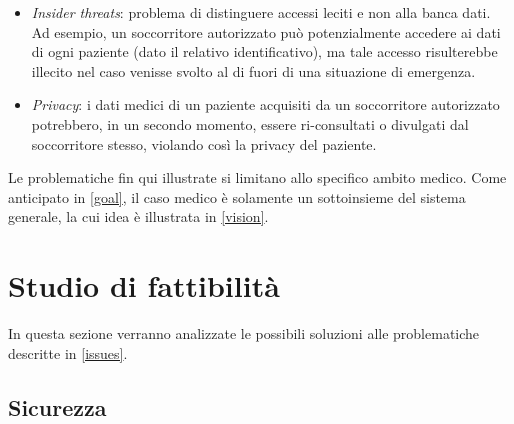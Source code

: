 \documentclass[a4paper,12pt]{report}
\begin{document}
\begin{description}
\begin{itemize}
		\item \emph{Insider threats}: problema di distinguere accessi leciti e non alla banca dati. Ad esempio, un soccorritore autorizzato può potenzialmente accedere ai dati di ogni paziente (dato il relativo identificativo), ma tale accesso risulterebbe illecito nel caso venisse svolto al di fuori di una situazione di emergenza.
		\item \emph{Privacy}: i dati medici di un paziente acquisiti da un soccorritore autorizzato potrebbero, in un secondo momento, essere ri-consultati o divulgati dal soccorritore stesso, violando così la privacy del paziente.
	\end{itemize} 
\end{description}
Le problematiche fin qui illustrate si limitano allo specifico ambito medico. Come anticipato in \autoref{goal}, il caso medico è solamente un sottoinsieme del sistema generale, la cui idea è illustrata in \autoref{vision}. 

\section{Studio di fattibilità} \label{feasibility}

In questa sezione verranno analizzate le possibili soluzioni alle problematiche descritte in \autoref{issues}.

\subsection{Sicurezza}\label{security_issues}
\end{document}
